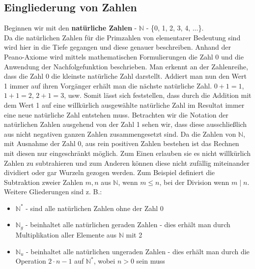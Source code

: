 \documentclass[12pt,a4paper]{article}
\theoremstyle{definition}
\begin{document}
\subsection{Eingliederung von Zahlen}\label{Eingliederung von Zahlen}
Beginnen wir mit den \textbf{natürliche Zahlen} - $\mathbb{N}$ - \{0, 1, 2, 3, 4, ...\}.\\
Da die natürlichen Zahlen für die Primzahlen von elementarer Bedeutung sind wird hier in die Tiefe gegangen und diese genauer beschreiben.
Anhand der Peano-Axiome wird mittels mathematischen Formulierungen die Zahl 0 und die Anwendung der Nachfolgefunktion beschrieben.\newline 
Man erkennt an der Zahlenreihe, dass die Zahl 0 die kleinste natürliche Zahl darstellt.
Addiert man nun den Wert 1 immer auf ihren Vorgänger erhält man die nächste natürliche Zahl.
$0 + 1 = 1$, $1 + 1 = 2$, $2 + 1 = 3$, usw.
Somit lässt sich feststellen, dass durch die Addition mit dem Wert 1 auf eine willkürlich ausgewählte natürliche Zahl im Resultat immer eine neue natürliche Zahl entstehen muss.
Betrachten wir die Notation der natürlichen Zahlen ausgehend von der Zahl 1 sehen wir, dass diese ausschließlich aus nicht negativen ganzen Zahlen zusammengesetzt sind.\newline
Da die Zahlen von $\mathbb{N}$, mit Ausnahme der Zahl 0, aus rein positiven Zahlen bestehen ist das Rechnen mit diesen nur eingeschränkt möglich.
Zum Einen erlauben sie es nicht willkürlich Zahlen zu subtrahieren und zum Anderen können diese nicht zufällig miteinander dividiert oder gar Wurzeln gezogen werden.
Zum Beispiel definiert die Subtraktion zweier Zahlen $m, n$ aus $\mathbb{N}$, wenn $m \le n$, bei der Division wenn $m \mid n$.\newline
Weitere Gliederungen sind z. B.:
\begin{itemize}
\item $\mathbb{N}^*$ - sind alle natürlichen Zahlen ohne der Zahl 0
\item $\mathbb{N}_g$ - beinhaltet alle natürlichen geraden Zahlen - dies erhält man durch Multiplikation aller Elemente aus $\mathbb{N}$ mit 2
\item $\mathbb{N}_u$ - beinhaltet alle natürlichen ungeraden Zahlen - dies erhält man durch die Operation $2 \cdot n - 1$ auf $\mathbb{N}^*$, wobei $n > 0$ sein muss
\end{itemize}
\end{document}
